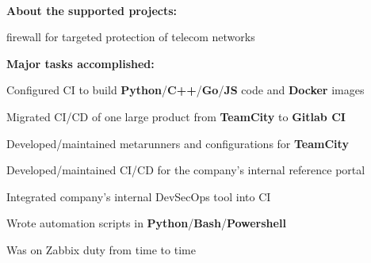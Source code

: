 \documentclass[a4paper]{MagicalCV}
\begin{document}
\begin{minipage}[t]{0.64\textwidth}
 \\
\vspace{\topsep} %
\textbf{About the supported projects:} 
\begin{tightemize}
  \item firewall for targeted protection of telecom networks
\end{tightemize}
\textbf{Major tasks accomplished:}
\begin{tightemize}
  \item Configured CI to build \textbf{Python}/\textbf{C++}/\textbf{Go}/\textbf{JS} code and \textbf{Docker} images
  \item Migrated CI/CD of one large product from \textbf{TeamCity} to \textbf{Gitlab CI}
  \item Developed/maintained metarunners and configurations for \textbf{TeamCity}
  \item Developed/maintained CI/CD for the company's internal reference portal
  \item Integrated company's internal DevSecOps tool into CI
  \item Wrote automation scripts in \textbf{Python}/\textbf{Bash}/\textbf{Powershell}
  \item Was on Zabbix duty from time to time
\end{tightemize}
\sectionsep

\end{minipage} 
\end{document}
